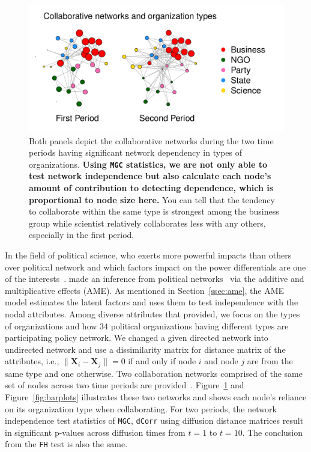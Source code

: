 \documentclass[12pt]{article}
\theoremstyle{definition}
\begin{document}
\begin{figure}[H]
	\centering
	\includegraphics[width=\linewidth]{../Figure/two_politics.pdf}
	\caption{Both panels depict the collaborative networks during the two time periods having significant network dependency in types of organizations. \textbf{Using \texttt{MGC} statistics, we are not only able to test network independence but also calculate each node's amount of contribution to detecting dependence, which is proportional to node size here.} You can tell that the tendency to collaborate within the same type is strongest among the business group while scientist relatively collaborates less with any others, especially in the first period.}
	\label{fig:politics}
\end{figure}
	
In the field of political science, who exerts more powerful impacts than others over political network and which factors impact on the power differentials are one of the interests~\citep{ingold2014structural}. \cite{minhas2016inferential} made an inference from political networks~\citep{cranmer2016navigating} via the additive and multiplicative effects (AME). As mentioned in Section~\ref{ssec:ame}, the AME model estimates the latent factors and uses them to test independence with the nodal attributes. Among diverse attributes that \cite{cranmer2016navigating} provided, we focus on the types of organizations and how 34 political organizations having different types are participating policy network. We changed a given directed network into undirected network and use a dissimilarity matrix for distance matrix of the attributes, i.e., $\parallel \mathbf{X}_{i}  - \mathbf{X}_{j} \parallel = 0$ if and only if node $i$ and node $j$ are from the same type and one otherwise. Two collaboration networks comprised of the same set of nodes across two time periods are provided~\citep{ingold2014structural}. Figure~\ref{fig:politics} and Figure~\ref{fig:barplots} illustrates these two networks and shows each node's reliance on its organization type when collaborating. For two periods, the network independence test statistics of \texttt{MGC}, \texttt{dCorr} using diffusion distance matrices result in significant p-values across diffusion times from $t=1$ to $t=10$. The conclusion from the \texttt{FH} test is also the same.  
\end{document}
